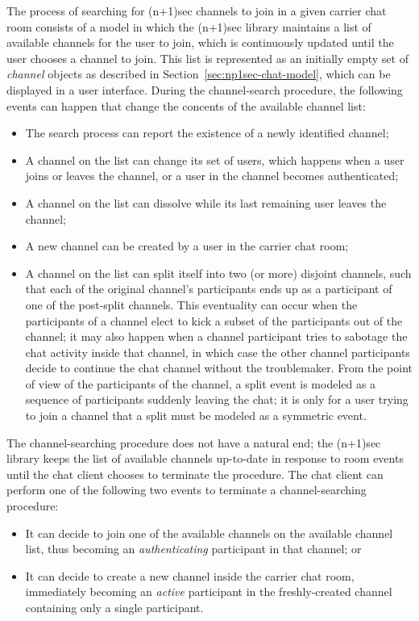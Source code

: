 \documentclass{article}
\begin{document}
The process of searching for (n+1)sec channels to join in a given carrier chat room consists of a model in which the (n+1)sec library maintains a list of available channels for the user to join, which is continuously updated until the user chooses a channel to join.
This list is represented as an initially empty set of \emph{channel} objects as described in Section~\ref{sec:np1sec-chat-model}, which can be displayed in a user interface.
During the channel-search procedure, the following events can happen that change the concents of the available channel list:
\begin{itemize}
\item The search process can report the existence of a newly identified channel;
\item A channel on the list can change its set of users, which happens when a user joins or leaves the channel, or a user in the channel becomes authenticated;
\item A channel on the list can dissolve while its last remaining user leaves the channel;
\item A new channel can be created by a user in the carrier chat room;
\item A channel on the list can split itself into two (or more) disjoint channels, such that each of the original channel's participants ends up as a participant of one of the post-split channels. This eventuality can occur when the participants of a channel elect to kick a subset of the participants out of the channel; it may also happen when a channel participant tries to sabotage the chat activity inside that channel, in which case the other channel participants decide to continue the chat channel without the troublemaker. From the point of view of the participants of the channel, a split event is modeled as a sequence of participants suddenly leaving the chat; it is only for a user trying to join a channel that a split must be modeled as a symmetric event.
\end{itemize}
The channel-searching procedure does not have a natural end; the (n+1)sec library keeps the list of available channels up-to-date in response to room events until the chat client chooses to terminate the procedure.
The chat client can perform one of the following two events to terminate a channel-searching procedure:
\begin{itemize}
\item It can decide to join one of the available channels on the available channel list, thus becoming an \emph{authenticating} participant in that channel; or
\item It can decide to create a new channel inside the carrier chat room, immediately becoming an \emph{active} participant in the freshly-created channel containing only a single participant.
\end{itemize}
\end{document}
